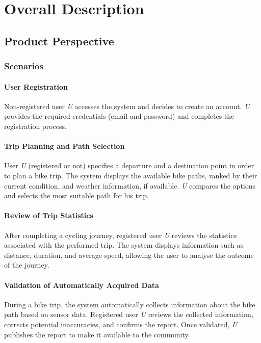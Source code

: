 \section{Overall Description}

\subsection{Product Perspective}

\subsubsection{Scenarios}

\paragraph{User Registration}
Non-registered user \textit{U} accesses the system and decides to create an account. \textit{U} provides the required credentials (email and password) and completes the registration process.

\paragraph{Trip Planning and Path Selection}
User \textit{U} (registered or not) specifies a departure and a destination point in order to plan a bike trip. The system displays the available bike paths, ranked by their current condition, and weather information, if available. \textit{U} compares the options and selects the most suitable path for his trip.

\paragraph{Review of Trip Statistics}
After completing a cycling journey, registered user \textit{U} reviews the statistics associated with the performed trip. The system displays information such as distance, duration, and average speed, allowing the user to analyse the outcome of the journey.

\paragraph{Validation of Automatically Acquired Data}
During a bike trip, the system automatically collects information about the bike path based on sensor data. Registered user \textit{U} reviews the collected information, corrects potential inaccuracies, and confirms the report. Once validated, \textit{U} publishes the report to make it available to the community.

